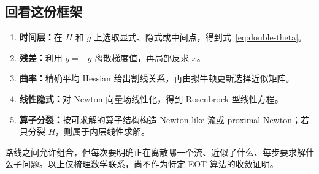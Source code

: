 \documentclass[11pt,a4paper]{ctexart}
\begin{document}
\subsection*{回看这份框架}
\begin{enumerate}[label=\arabic*. ,leftmargin=2.8em,itemsep=0.15em]
\item \textbf{时间层：}在 $H$ 和 $g$ 上选取显式、隐式或中间点，得到式~\eqref{eq:double-theta}。
\item \textbf{残差：}利用 $\dot g=-g$ 离散梯度值，再局部反求 $x$。
\item \textbf{曲率：}精确平均 Hessian 给出割线关系，再由拟牛顿更新选择近似矩阵。
\item \textbf{线性隐式：}对 Newton 向量场线性化，得到 Rosenbrock 型线性方程。
\item \textbf{算子分裂：}按可求解的算子结构构造 Newton-like 流或 proximal Newton；若只分裂 $H$，则属于内层线性求解。
\end{enumerate}
路线之间允许组合，但每次要明确正在离散哪一个流、近似了什么、每步要求解什么子问题。以上仅梳理数学联系，尚不作为特定 EOT 算法的收敛证明。
\end{document}

